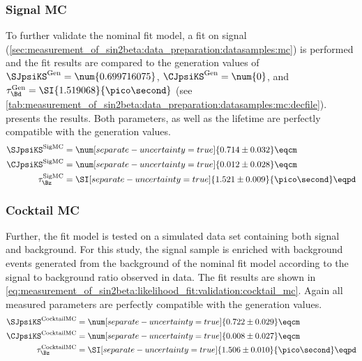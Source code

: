 \subsubsection{Signal \acs*{MC}}
\label{sec:measurement_of_sin2beta:likelihood_fit:validation:signal_mc}

To further validate the nominal fit model, a fit on signal \MC
(\cref{sec:measurement_of_sin2beta:data_preparation:datasamples:mc}) is
performed and the fit results are compared to the generation values of
$\SJpsiKS^{\text{Gen}} = \num{0.699716075}$, $\CJpsiKS^{\text{Gen}} = \num{0}$,
and $\tau_{\Bd}^{\text{Gen}} = \SI{1.519068}{\pico\second}$ (see
\cref{tab:measurement_of_sin2beta:data_preparation:datasamples:mc:decfile}).
 presents
the results. Both \CP parameters, as well as the \Bd lifetime are perfectly
compatible with the generation values.
%
\begin{equation}\label{eq:measurement_of_sin2beta:likelihood_fit:validation:signal_mc}
\begin{split}
  \SJpsiKS^{\text{SigMC}}   &= \num[separate-uncertainty=true]{0.714 \pm 0.032} \eqcm \\
  \CJpsiKS^{\text{SigMC}}   &= \num[separate-uncertainty=true]{0.012 \pm 0.028} \eqcm \\
  \tau_{\Bz}^{\text{SigMC}} &= \SI[separate-uncertainty=true]{1.521  \pm 0.009}{\pico\second} \eqpd \\
\end{split}
\end{equation}

\subsubsection{Cocktail \acs*{MC}}
\label{sec:measurement_of_sin2beta:likelihood_fit:validation:cocktail_mc}

Further, the fit model is tested on a simulated data set containing both signal
and background. For this study, the signal \MC sample is enriched with background
events generated from the background \PDF of the nominal fit model according to
the signal to background ratio observed in data. The fit results are shown in
\cref{eq:measurement_of_sin2beta:likelihood_fit:validation:cocktail_mc}. Again
all measured parameters are perfectly compatible with the generation values.
%
\begin{equation}\label{eq:measurement_of_sin2beta:likelihood_fit:validation:cocktail_mc}
\begin{split}
  \SJpsiKS^{\text{CocktailMC}}   &= \num[separate-uncertainty=true]{0.722 \pm 0.029}  \eqcm \\
  \CJpsiKS^{\text{CocktailMC}}   &= \num[separate-uncertainty=true]{0.008 \pm 0.027}  \eqcm \\
  \tau_{\Bz}^{\text{CocktailMC}} &= \SI[separate-uncertainty=true]{1.506  \pm 0.010}{\pico\second} \eqpd \\
\end{split}
\end{equation}

